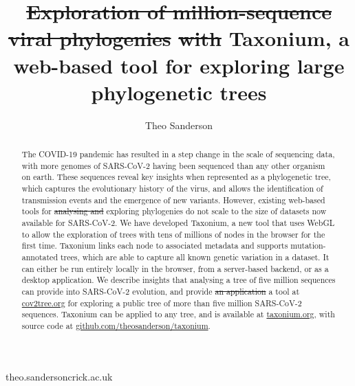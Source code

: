 \documentclass[twocolumn]{bioRxiv}
\providecommand{\DIFadd}[1]{{\protect\color{teal}#1}}
\providecommand{\DIFdel}[1]{{\protect\color{red}\sout{#1}}}
\providecommand{\DIFaddbegin}{}
\providecommand{\DIFaddend}{}
\providecommand{\DIFdelbegin}{}
\providecommand{\DIFdelend}{}
\begin{document}

\title{\DIFdelbegin \DIFdel{Exploration of million-sequence viral phylogenies }%
\DIFdel{with }\DIFdelend Taxonium\DIFaddbegin \DIFadd{, a web-based tool for exploring large phylogenetic trees}\DIFaddend }

\author[1]{Theo Sanderson }

\date{}

\maketitle

\begin{abstract}
The COVID-19 pandemic has resulted in a step change in the scale of sequencing data, with more genomes of SARS-CoV-2 having been sequenced than any other organism on earth. These sequences reveal key insights when represented as a phylogenetic tree, which captures the evolutionary history of the virus, and allows the identification of transmission events and the emergence of new variants. However, existing web-based tools for \DIFdelbegin \DIFdel{analysing and }\DIFdelend exploring phylogenies do not scale to the size of datasets now available for SARS-CoV-2. We have developed Taxonium, a new tool that uses WebGL to allow the exploration of trees with tens of millions of nodes in the browser for the first time. Taxonium links each node to associated metadata and supports mutation-annotated trees, which are able to capture all known genetic variation in a dataset. \DIFaddbegin \DIFadd{It can either be run entirely locally in the browser, from a server-based backend, or as a desktop application.  }\DIFaddend We describe insights that analysing a tree of five million sequences can provide into SARS-CoV-2 evolution, and provide \DIFdelbegin \DIFdel{an application }\DIFdelend \DIFaddbegin \DIFadd{a tool }\DIFaddend at \href{http://cov2tree.org}{cov2tree.org} for exploring a public tree of more than five million SARS-CoV-2 sequences. Taxonium can be applied to any tree, and is available at \href{http://taxonium.org}{taxonium.org}, with source code at \href{https://github.com/theosanderson/taxonium}{github.com/theosanderson/taxonium}.


\end{abstract}


\begin{corrauthor}
theo.sanderson\at crick.ac.uk
\end{corrauthor}
\end{document}
